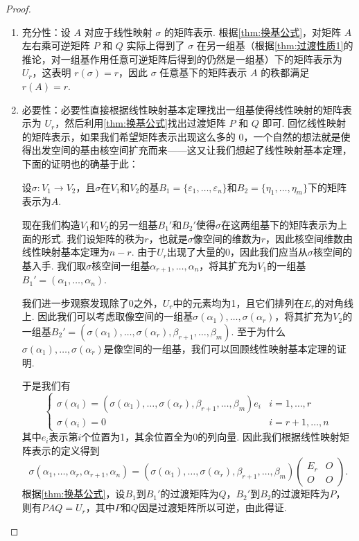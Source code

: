 \begin{proof}
    \begin{enumerate}
        \item 充分性：设 $A$ 对应于线性映射 $\sigma$ 的矩阵表示. 根据\autoref{thm:换基公式}，对矩阵 $A$ 左右乘可逆矩阵 $P$ 和 $Q$ 实际上得到了 $\sigma$ 在另一组基（根据\autoref{thm:过渡性质1}的推论，对一组基作用任意可逆矩阵后得到的仍然是一组基）下的矩阵表示为 $U_r$，这表明 $r(\sigma) = r$，因此 $\sigma$ 任意基下的矩阵表示 $A$ 的秩都满足 $r(A) = r$.

        \item 必要性：必要性直接根据线性映射基本定理找出一组基使得线性映射的矩阵表示为 $U_r$，然后利用\autoref{thm:换基公式}找出过渡矩阵 $P$ 和 $Q$ 即可. 回忆线性映射的矩阵表示，如果我们希望矩阵表示出现这么多的 $0$，一个自然的想法就是使得出发空间的基由核空间扩充而来——这又让我们想起了线性映射基本定理，下面的证明也的确基于此：

        设$\sigma:V_1\to V_2$，且$\sigma$在$V_1$和$V_2$的基$B_1=\{\varepsilon_1,\ldots,\varepsilon_n\}$和$B_2=\{\eta_1,\ldots,\eta_m\}$下的矩阵表示为$A$.

        现在我们构造$V_1$和$V_2$的另一组基$B_1'$和$B_2'$使得$\sigma$在这两组基下的矩阵表示为上面的形式. 我们设矩阵的秩为$r$，也就是$\sigma$像空间的维数为$r$，因此核空间维数由线性映射基本定理为$n-r$. 由于$U_r$出现了大量的0，因此我们应当从$\sigma$核空间的基入手. 我们取$\sigma$核空间一组基$\alpha_{r+1},\ldots,\alpha_n$，将其扩充为$V_1$的一组基$B_1'=(\alpha_1,\ldots,\alpha_n)$.

        我们进一步观察发现除了0之外，$U_r$中的元素均为1，且它们排列在$E_r$的对角线上. 因此我们可以考虑取像空间的一组基$\sigma(\alpha_1),\ldots,\sigma(\alpha_r)$，将其扩充为$V_2$的一组基$B_2'=(\sigma(\alpha_1),\ldots,\sigma(\alpha_r),\beta_{r+1},\ldots,\beta_m)$. 至于为什么$\sigma(\alpha_1),\ldots,\sigma(\alpha_r)$是像空间的一组基，我们可以回顾线性映射基本定理的证明.

        于是我们有
        \[\begin{cases}
                \sigma(\alpha_i)=(\sigma(\alpha_1),\ldots,\sigma(\alpha_r),\beta_{r+1},\ldots,\beta_m)e_i & i=1,\ldots,r   \\
                \sigma(\alpha_i)=0                                                                        & i=r+1,\ldots,n
            \end{cases}\]
        其中$e_i$表示第$i$个位置为1，其余位置全为0的列向量. 因此我们根据线性映射矩阵表示的定义得到
        \[\sigma(\alpha_1,\ldots,\alpha_r,\alpha_{r+1},\alpha_n)=(\sigma(\alpha_1),\ldots,\sigma(\alpha_r),\beta_{r+1},\ldots,\beta_m)\begin{pmatrix}
                E_r & O \\ O & O
            \end{pmatrix}.\]
        根据\autoref{thm:换基公式}，设$B_1$到$B_1'$的过渡矩阵为$Q$，$B_2'$到$B_2$的过渡矩阵为$P$，则有$PAQ=U_r$，其中$P$和$Q$因是过渡矩阵所以可逆，由此得证.
    \end{enumerate}
\end{proof}

